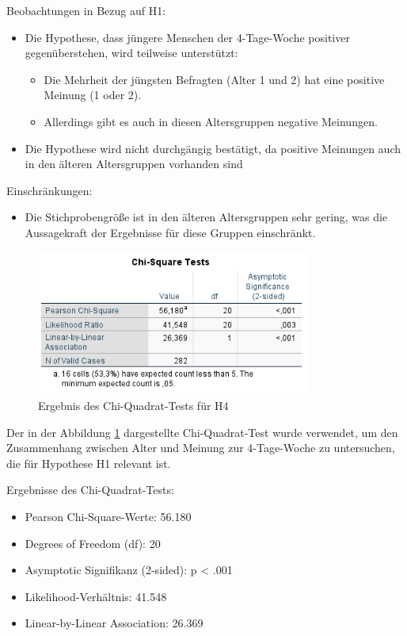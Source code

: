 Beobachtungen in Bezug auf H1:

\begin{itemize}
    \item Die Hypothese, dass jüngere Menschen der 4-Tage-Woche positiver gegenüberstehen,
    wird teilweise unterstützt:
    \begin{itemize}
        \item Die Mehrheit der jüngsten Befragten (Alter 1 und 2) hat eine positive Meinung (1 oder 2).
        \item Allerdings gibt es auch in diesen Altersgruppen negative Meinungen.
    \end{itemize}
    \item Die Hypothese wird nicht durchgängig bestätigt, da positive Meinungen auch in den 
    älteren Altersgruppen vorhanden sind
\end{itemize}

Einschränkungen:
\begin{itemize}
    \item Die Stichprobengröße ist in den älteren Altersgruppen sehr gering, was die Aussagekraft der 
    Ergebnisse für diese Gruppen einschränkt.
\end{itemize}

\begin{figure}[h]
    \centering
    \includegraphics[width=0.8\textwidth]{04_Artefakte/01_Abbildungen/hypothese_1/h1_chi.png}
    \caption{Ergebnis des Chi-Quadrat-Tests für H4}
    \label{fig:h1_chi}
\end{figure}

Der in der Abbildung \ref*{fig:h1_chi} dargestellte Chi-Quadrat-Test wurde verwendet, um den Zusammenhang 
zwischen Alter und Meinung zur 4-Tage-Woche zu untersuchen, die für Hypothese H1 relevant ist.

Ergebnisse des Chi-Quadrat-Tests:
\begin{itemize}
    \item Pearson Chi-Square-Werte: 56.180
    \item Degrees of Freedom (df): 20
    \item Asymptotic Signifikanz (2-sided): p < .001
    \item Likelihood-Verhältnis: 41.548
    \item Linear-by-Linear Association: 26.369
\end{itemize}

